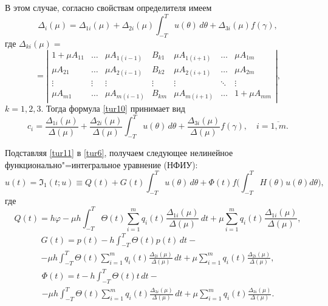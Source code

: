 В этом случае, согласно свойствам определителя имеем
 $$
\Delta_{i} (\mu)=\Delta_{ 1 i} (\mu)+\Delta_{ 2 i} (\mu)   \int _{-T}^T u (\theta) \, d \theta + \Delta_{ 3 i} (\mu)  f (\gamma) ,
$$
где 
$
\Delta_{k i}(\mu)=
$
$$
=\left| \begin{array}{ccccccc}
1+\mu  A_{11} & \ldots & \mu  A_{1 (i-1)} & B_{k 1}  & \mu  A_{1 (i+1)} & \ldots & \mu  A_{1 m}\\
\mu  A_{21} & \ldots & \mu  A_{2 (i-1)}  & B_{k 2}  & \mu  A_{2 (i+1)} &  \ldots & \mu  A_{2 m} \\
\vdots &  \vdots & \vdots & \vdots & \vdots &  \ddots & \vdots \\
\mu  A_{m 1} & \ldots & \mu   A_{m (i-1)} & B_{k m}  & \mu  A_{m (i+1)} & \ldots  & 1+\mu  A_{m m}
\end{array} \right| ,$$
$
k=1 , 2, 3.$
Тогда формула \eqref{tur10} принимает вид
\begin {equation}\label{tur11}
c_{i}=\frac{\Delta_{ 1 i}(\mu)}{\Delta (\mu )}+
\frac{\Delta_{2 i}(\mu)}{\Delta (\mu )}   \int _{-T}^T u (\theta) \, d \theta
+\frac{\Delta_{ 3 i}(\mu)}{\Delta (\mu )}   f (\gamma) , \quad  i=\overline{1 , m} . 
\end{equation}

Подставляя \eqref{tur11} в \eqref{tur6}, получаем следующее нелинейное функционально"=интегральное уравнение (НФИУ):
\begin{equation}
u (t) =\Im_{1} (t;  u) \equiv Q (t)+ G (t)  \int _{-T}^T u (\theta) \, d \theta+ \Phi (t)  f \biggl( \int _{-T}^T  H (\theta)  u (\theta) d \theta \biggr) ,  \label{tur12}
\end{equation}
где
$$
Q (t)=h   \varphi-
\mu  h  \int _{-T}^T \Theta (t) \sum \limits_{i=1}^{m} q_{i} (t)  \frac{\Delta_{ 1 i}(\mu)}{\Delta (\mu )} \, d t+\mu  \sum \limits_{i=1}^{m} q_{i} (t)  \frac{\Delta_{1 i}(\mu)}{\Delta (\mu )} ,
$$
\begin{multline}
G (t)= p (t)-h  \int _{-T}^T \Theta (t)  p (t) \, d t-
\\
-\mu  h  \int _{-T}^T \Theta (t) \sum \limits_{i=1}^{m} q_{i} (t)  \frac{\Delta_{2 i}(\mu)}{\Delta (\mu )} \, d t+\mu \sum \limits_{i=1}^{m} q_{i} (t)  \frac{\Delta_{ 2 i}(\mu)}{\Delta (\mu )} ,
\end{multline}
\begin{multline}
\Phi (t)=t-h  \int _{-T}^T \Theta (t)  t \, d t-
\\
-\mu  h  \int _{-T}^T \Theta (t)  \sum \limits_{i=1}^{m} q_{i} (t)  \frac{\Delta_{ 3 i}(\mu)}{\Delta (\mu )} \, d t+\mu  \sum \limits_{i=1}^{m} q_{i} (t)  \frac{\Delta_{3 i}(\mu)}{\Delta (\mu )} .
\end{multline}

